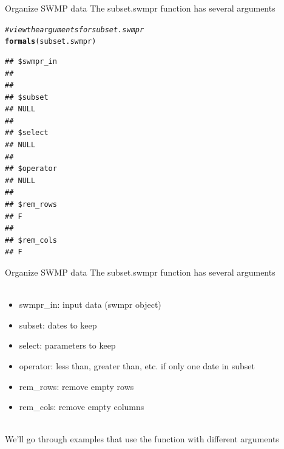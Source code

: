 \documentclass[xcolor=svgnames]{beamer}\usepackage[]{graphicx}\usepackage[]{color}
\makeatletter
\newcommand{\hlcom}[1]{\textcolor[rgb]{0.678,0.584,0.686}{\textit{#1}}}%
\newcommand{\hlstd}[1]{\textcolor[rgb]{0.345,0.345,0.345}{#1}}%
\newcommand{\hlkwd}[1]{\textcolor[rgb]{0.737,0.353,0.396}{\textbf{#1}}}%
\newenvironment{kframe}{%
 \def\at@end@of@kframe{}%
 \ifinner\ifhmode%
  \def\at@end@of@kframe{\end{minipage}}%
  \begin{minipage}{\columnwidth}%
 \fi\fi%
 \def\FrameCommand##1{\hskip\@totalleftmargin \hskip-\fboxsep
 \colorbox{shadecolor}{##1}\hskip-\fboxsep
     \hskip-\linewidth \hskip-\@totalleftmargin \hskip\columnwidth}%
 \MakeFramed {\advance\hsize-\width
   \@totalleftmargin\z@ \linewidth\hsize
   \@setminipage}}%
 {\par\unskip\endMakeFramed%
 \at@end@of@kframe}
\newenvironment{knitrout}{}{} %
\makeatother
\begin{document}
\begin{frame}[containsverbatim]{Organize SWMP data}
The subset.swmpr function has several arguments
\begin{knitrout}\scriptsize
{}\color{fgcolor}\begin{kframe}
\begin{alltt}
\hlcom{# view the arguments for subset.swmpr}
\hlkwd{formals}\hlstd{(subset.swmpr)}
\end{alltt}
\begin{verbatim}
## $swmpr_in
## 
## 
## $subset
## NULL
## 
## $select
## NULL
## 
## $operator
## NULL
## 
## $rem_rows
## F
## 
## $rem_cols
## F
\end{verbatim}
\end{kframe}
\end{knitrout}
\end{frame}

\begin{frame}[containsverbatim]{Organize SWMP data}
The subset.swmpr function has several arguments \\~\\
\begin{itemize}
\item swmpr\_in: input data (swmpr object)
\item subset: dates to keep
\item select: parameters to keep
\item operator: less than, greater than, etc. if only one date in subset
\item rem\_rows: remove empty rows
\item rem\_cols: remove empty columns \\~\\
\end{itemize}
We'll go through examples that use the function with different arguments
\end{frame}
\end{document}
